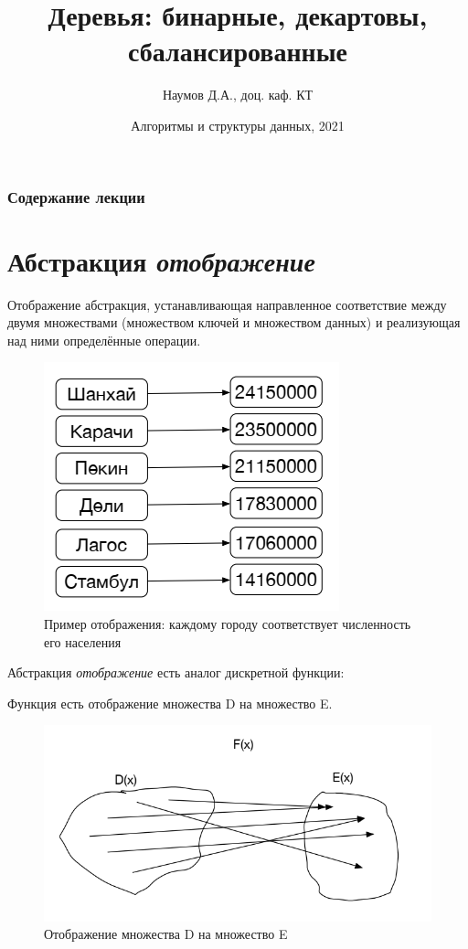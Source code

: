 \documentclass{beamer}
\title[Деревья]{Деревья: бинарные, декартовы, сбалансированные}
\author{Наумов Д.А., доц. каф. КТ}
\date[12.04.2021] {Алгоритмы и структуры данных, 2021}
\begin{document}
\begin{frame}
  \titlepage
\end{frame}
  
\begin{frame}
  \frametitle{Содержание лекции}
  \tableofcontents  
\end{frame}

\section{Абстракция \textit{отображение}}
  
\begin{frame}[t]
	\begin{block}{Отображение}
		 абстракция, устанавливающая направленное соответствие между двумя множествами (множеством ключей и множеством данных) и реализующая над ними определённые операции. 
	\end{block}	
	\begin{figure}[h]
		\centering
		\includegraphics[scale=0.5]{images/lec07-pic01.png}
		\caption{Пример отображения: каждому городу соответствует численность его населения}
	\end{figure}
\end{frame}	

\begin{frame}[t]	
	Абстракция \textit{отображение} есть аналог дискретной функции:
	\begin{block}{Функция}
		 есть отображение множества D на множество E. 
	\end{block}
	\begin{figure}[h]
		\centering
		\includegraphics[scale=0.5]{images/lec07-pic02.png}
		\caption{Отображение множества D на множество E}
	\end{figure}
\end{frame}
 
\end{document}
